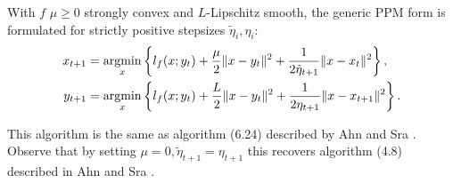 \documentclass[12pt]{article}
\begin{document}
            \begin{definition}\label{def:agg_ppm}
                With $f$ $\mu \ge 0$ strongly convex and $L$-Lipschitz smooth, the generic PPM form is formulated for strictly positive stepsizes $\tilde \eta_i,\eta_i$: 
                \begin{align*}
                    x_{t + 1} &= \mathop{\rm argmin}\limits_{x} \left\lbrace
                        l_f(x; y_t) 
                        + 
                        \frac{\mu}{2}\Vert x - y_t\Vert^2
                        + 
                        \frac{1}{2\tilde \eta_{t + 1}} \Vert x - x_t\Vert^2
                    \right\rbrace, 
                    \\
                    y_{t + 1} &= \mathop{\rm argmin}\limits_{x} 
                    \left\lbrace
                        l_f(x; y_t) + \frac{L}{2}\Vert x - y_t\Vert^2 + 
                        \frac{1}{2\eta_{t + 1}}\Vert x - x_{t + 1}\Vert^2
                    \right\rbrace. 
                \end{align*}
            \end{definition}
            \begin{remark}
                This algorithm is the same as algorithm (6.24) described by Ahn and Sra \cite{ahn_understanding_2022}. 
                Observe that by setting $\mu = 0, \tilde \eta_{t + 1} = \eta_{t + 1}$ this recovers algorithm (4.8) described in Ahn and Sra \cite{ahn_understanding_2022}. 
            \end{remark}
\end{document}
